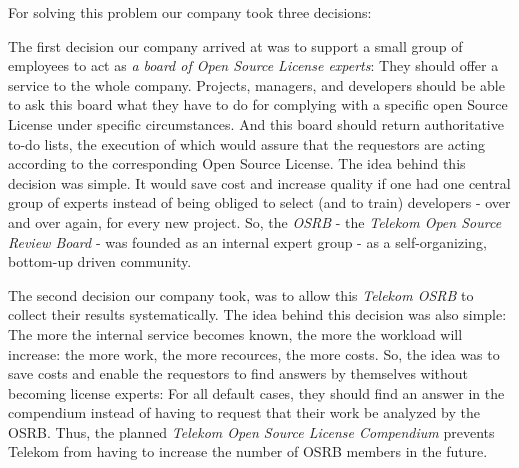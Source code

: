 For solving this problem our company took three decisions:

The first decision our company arrived at was to support a small group of
employees to act as \emph{a board of Open Source License experts}: They should
offer a service to the whole company. Projects, managers, and developers should
be able to ask this board what they have to do for complying with a specific
open Source License under specific circumstances. And this board should return
authoritative to-do lists, the execution of which would assure that the
requestors are acting according to the corresponding Open Source License. The
idea behind this decision was simple. It would save cost and increase quality if
one had one central group of experts instead of being obliged to select (and to
train) developers - over and over again, for every new project. So, the
\emph{OSRB} - the \emph{Telekom Open Source Review Board} - was founded as an
internal expert group - as a self-organizing, bottom-up driven community.

The second decision our company took, was to allow this \emph{Telekom OSRB} to
collect their results systematically. The idea behind this decision was also
simple: The more the internal service becomes known, the more the workload will
increase: the more work, the more recources, the more costs. So, the idea was to
save costs and enable the requestors to find answers by themselves without
becoming license experts: For all default cases, they should find an answer in
the compendium instead of having to request that their work be analyzed by the
OSRB. Thus, the planned \emph{Telekom Open Source License Compendium} prevents
Telekom from having to increase the number of OSRB members in the future.

